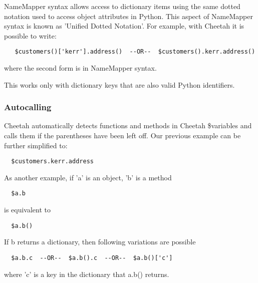 NameMapper syntax allows access to dictionary items using the same dotted
notation used to access object attributes in Python.  This aspect of NameMapper
syntax is known as 'Unified Dotted Notation'.
For example, with Cheetah it is possible to write:
\begin{verbatim}
   $customers()['kerr'].address()  --OR--  $customers().kerr.address()
\end{verbatim}
where the second form is in NameMapper syntax.

This works only with dictionary keys that are also valid Python identifiers.

\subsubsection{Autocalling}
\label{language.namemapper.autocalling}

Cheetah automatically detects functions and methods in Cheetah \$variables and
calls them if the parentheses have been left off.  Our previous example can be
further simplified to:
\begin{verbatim}
  $customers.kerr.address
\end{verbatim}

As another example, if 'a' is an object, 'b' is a method
\begin{verbatim}
  $a.b
\end{verbatim}

is equivalent to

\begin{verbatim}
  $a.b()
\end{verbatim}

If b returns a dictionary, then following variations are possible
\begin{verbatim}
  $a.b.c  --OR--  $a.b().c  --OR--  $a.b()['c']
\end{verbatim}
where 'c' is a key in the dictionary that a.b() returns.

